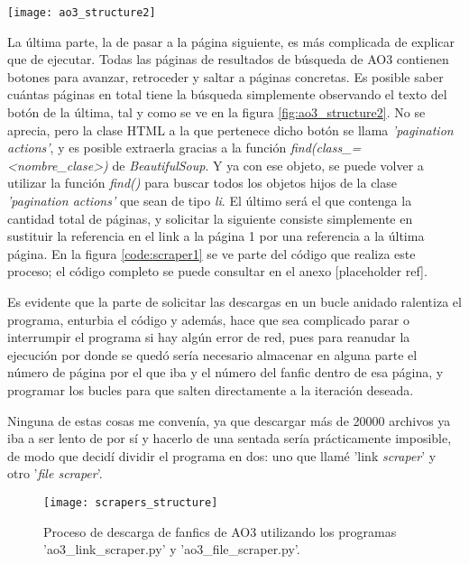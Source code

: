 \documentclass{pre-tfg}
\newcommand{\refToLinkScraperCode}{[placeholder ref]}
\begin{document}
\begin{SCfigure}
	\caption{Navegación de páginas de búsqueda de AO3. Todos los botones vienen con su número de página, y se puede ver cuál es la última}
	\label{fig:ao3_structure2}
	\texttt{[image: ao3\_structure2]}
\end{SCfigure}

La última parte, la de pasar a la página siguiente, es más complicada de explicar que de ejecutar. Todas las páginas de resultados de búsqueda de AO3 contienen botones para avanzar, retroceder y saltar a páginas concretas. Es posible saber cuántas páginas en total tiene la búsqueda simplemente observando el texto del botón de la última, tal y como se ve en la figura \ref{fig:ao3_structure2}. No se aprecia, pero la clase HTML a la que pertenece dicho botón se llama \textit{'pagination actions'}, y es posible extraerla gracias a la función \textit{find(class\_=<nombre\_clase>)} de \textit{BeautifulSoup}. Y ya con ese objeto, se puede volver a utilizar la función \textit{find()} para buscar todos los objetos hijos de la clase \textit{'pagination actions'} que sean de tipo \textit{li}. El último será el que contenga la cantidad total de páginas, y solicitar la siguiente consiste simplemente en sustituir la referencia en el link a la página 1 por una referencia a la última página. En la figura \ref{code:scraper1} se ve parte del código que realiza este proceso; el código completo se puede consultar en el anexo \refToLinkScraperCode.

Es evidente que la parte de solicitar las descargas en un bucle anidado ralentiza el programa, enturbia el código y además, hace que sea complicado parar o interrumpir el programa si hay algún error de red, pues para reanudar la ejecución por donde se quedó sería necesario almacenar en alguna parte el número de página por el que iba y el número del fanfic dentro de esa página, y programar los bucles para que salten directamente a la iteración deseada.

Ninguna de estas cosas me convenía, ya que descargar más de 20000 archivos ya iba a ser lento de por sí y hacerlo de una sentada sería prácticamente imposible, de modo que decidí dividir el programa en dos: uno que llamé 'link \textit{scraper}' y otro '\textit{file scraper}'.

\begin{figure}[h]
	\texttt{[image: scrapers\_structure]}
	\caption{Proceso de descarga de fanfics de AO3 utilizando los programas 'ao3\_link\_scraper.py' y 'ao3\_file\_scraper.py'.}
	\label{fig:scrapers_structure}
	\centering
\end{figure}
\end{document}
